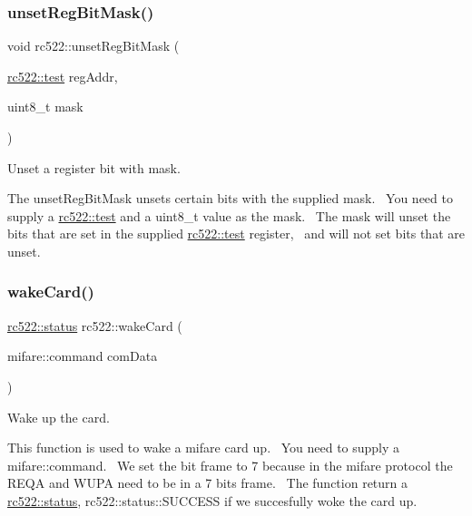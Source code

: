 \subsubsection{\texorpdfstring{unset\+Reg\+Bit\+Mask()}{unsetRegBitMask()}\hspace{0.1cm}{\footnotesize\ttfamily [4/4]}}
{\footnotesize\ttfamily void rc522\+::unset\+Reg\+Bit\+Mask (\begin{DoxyParamCaption}\item[{\hyperlink{classrc522_a9589917c9bbcd18ea9c7d86c7ec565bd}{rc522\+::test}}]{reg\+Addr,  }\item[{uint8\+\_\+t}]{mask }\end{DoxyParamCaption})}



Unset a register bit with mask. 

The unset\+Reg\+Bit\+Mask unsets certain bits with the supplied mask.~\newline
You need to supply a \hyperlink{classrc522_a9589917c9bbcd18ea9c7d86c7ec565bd}{rc522\+::test} and a uint8\+\_\+t value as the mask.~\newline
The mask will unset the bits that are set in the supplied \hyperlink{classrc522_a9589917c9bbcd18ea9c7d86c7ec565bd}{rc522\+::test} register,~\newline
and will not set bits that are unset. \mbox{\label{classrc522_a998688cd59ae05add31c7c6847bf02ae}} 
\subsubsection{\texorpdfstring{wake\+Card()}{wakeCard()}}
{\footnotesize\ttfamily \hyperlink{classspiReader_a4bcf984823c38cf4841ebf619e788790}{rc522\+::status} rc522\+::wake\+Card (\begin{DoxyParamCaption}\item[{mifare\+::command}]{com\+Data }\end{DoxyParamCaption})}



Wake up the card. 

This function is used to wake a mifare card up.~\newline
You need to supply a mifare\+::command.~\newline
We set the bit frame to 7 because in the mifare protocol the R\+E\+QA and W\+U\+PA need to be in a 7 bits frame.~\newline
The function return a \hyperlink{classspiReader_a4bcf984823c38cf4841ebf619e788790}{rc522\+::status}, rc522\+::status\+::\+S\+U\+C\+C\+E\+SS if we succesfully woke the card up. \mbox{\label{classrc522_ae660e16f131e5a28a4412b26d1f016a0}} 
